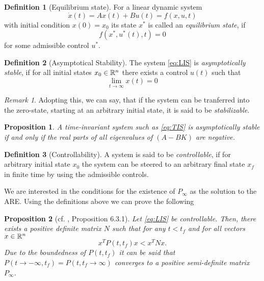 \documentclass[paper=a4, pagesize, DIV=calc, BCOR=12.5mm, twoside=on, onecolumn=on, open = any, titlepage =on, parskip =half-, headsepline = on, footsepline = on, chapterprefix = on, appendixprefix = off, fontsize = 12pt, numbers = noenddot, abstract = on]{scrbook}
\numberwithin{equation}{chapter}
\theoremstyle{definition}
\newtheorem{definition}{Definition}
\theoremstyle{plain}
\theoremstyle{plain}
\theoremstyle{remark}
\newtheorem{bemerkung}{Remark}
\theoremstyle{plain}
\theoremstyle{plain}
\newtheorem{prop}{Proposition}
\begin{document}
\begin{definition}[Equilibrium state]
For a linear dynamic system \begin{equation}
\dot{x}(t) = Ax(t) + Bu(t) = f(x, u, t) \label{eq:LIS}
\end{equation} with initial condition $x(0) = x_0$ its state $x^*$ is called an \emph{equilibrium state}, if\[ f(x^*, u^*(t), t) = 0\] for some admissible control $u^*$.
\end{definition}
\begin{definition}[Asymptotical Stability]
The system \eqref{eq:LIS} is \emph{asymptotically stable}, if for all initial states $x_0 \in \mathbb{R}^n$ there exists a control $u(t)$ such that \[\lim_{t \rightarrow \infty} x(t) = 0\]
\end{definition}
\begin{bemerkung}
Adopting this, we can say, that if the system can be tranferred into the zero-state, starting at an arbitrary initial state, it is said to be \emph{stabilizable}.
\end{bemerkung}
\begin{prop}
A time-invariant system such as \eqref{eq:TIS} is asymptotically stable if and only if the real parts of all eigenvalues of $(A-BK)$ are negative.
\end{prop}
\begin{definition}[Controllability]
A system is said to be \emph{controllable}, if for arbitrary initial state $x_0$ the system can be steered to an arbitrary final state $x_f$ in finite time by using the admissible controls.
\end{definition}
We are interested in the conditions for the existence of $P_\infty$ as the solution to the ARE. Using the definitions above we can prove the following
\begin{prop}[cf. \cite{li:2006}, Proposition 6.3.1]
Let \eqref{eq:LIS} be controllable. Then, there exists a positive definite matrix $N$ such that for any $t < t_f$ and for all vectors $x \in \mathbb{R}^n$
\[ x^TP(t,t_f)x < x^TNx.\]
Due to the boundedness of $P(t, t_f)$ it can be said that $P(t \rightarrow - \infty, t_f) = P(t, t_f \rightarrow \infty)$ converges to a positive semi-definite matrix $P_\infty$.
\end{prop}
\end{document}
